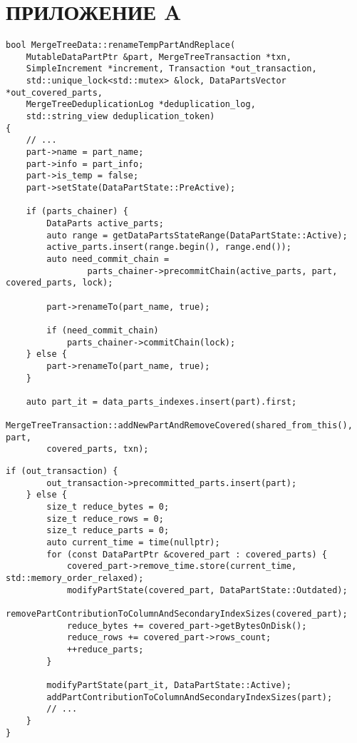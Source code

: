\section*{ПРИЛОЖЕНИЕ A}

\begin{lstlisting}[label=code:updrename, caption={Изменение состояний блоков (переименование блока).}]
bool MergeTreeData::renameTempPartAndReplace(
    MutableDataPartPtr &part, MergeTreeTransaction *txn,
    SimpleIncrement *increment, Transaction *out_transaction,
    std::unique_lock<std::mutex> &lock, DataPartsVector *out_covered_parts,
    MergeTreeDeduplicationLog *deduplication_log,
    std::string_view deduplication_token)
{
    // ...
    part->name = part_name;
    part->info = part_info;
    part->is_temp = false;
    part->setState(DataPartState::PreActive);

    if (parts_chainer) {
        DataParts active_parts;
        auto range = getDataPartsStateRange(DataPartState::Active);
        active_parts.insert(range.begin(), range.end());
        auto need_commit_chain =
                parts_chainer->precommitChain(active_parts, part, covered_parts, lock);

        part->renameTo(part_name, true);

        if (need_commit_chain)
            parts_chainer->commitChain(lock);
    } else {
        part->renameTo(part_name, true);
    }

    auto part_it = data_parts_indexes.insert(part).first;
    MergeTreeTransaction::addNewPartAndRemoveCovered(shared_from_this(), part,
        covered_parts, txn);
\end{lstlisting}

\pagebreak

\begin{lstlisting}[label=code:updrename2, caption={Изменение состояний блоков (переименование блока). Продолжение.}]
    if (out_transaction) {
        out_transaction->precommitted_parts.insert(part);
    } else {
        size_t reduce_bytes = 0;
        size_t reduce_rows = 0;
        size_t reduce_parts = 0;
        auto current_time = time(nullptr);
        for (const DataPartPtr &covered_part : covered_parts) {
            covered_part->remove_time.store(current_time, std::memory_order_relaxed);
            modifyPartState(covered_part, DataPartState::Outdated);
            removePartContributionToColumnAndSecondaryIndexSizes(covered_part);
            reduce_bytes += covered_part->getBytesOnDisk();
            reduce_rows += covered_part->rows_count;
            ++reduce_parts;
        }

        modifyPartState(part_it, DataPartState::Active);
        addPartContributionToColumnAndSecondaryIndexSizes(part);
        // ...
    }
}
\end{lstlisting}

\pagebreak